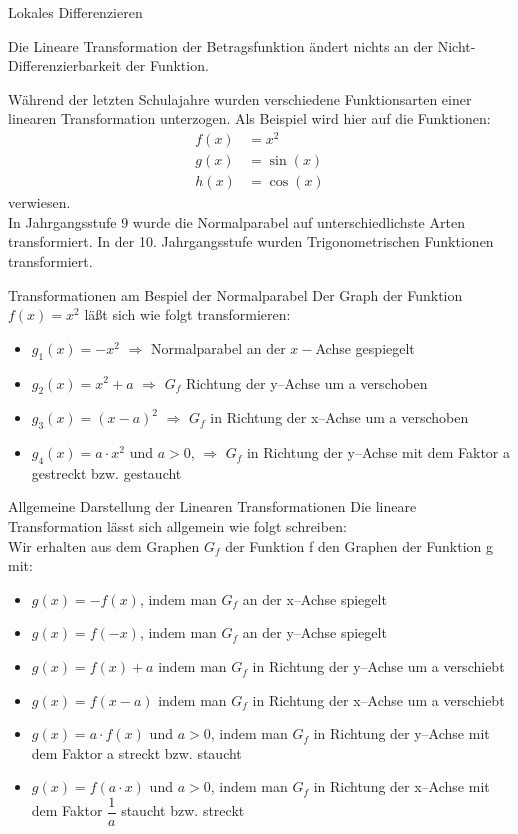 \documentclass[a4paper]{report}
\begin{document}
\begin{section}{Lokales Differenzieren}
\begin{bem*}{}
Die Lineare Transformation der Betragsfunktion ändert nichts an der Nicht-Differenzierbarkeit der Funktion.
\end{bem*}
Während der letzten Schulajahre wurden verschiedene Funktionsarten einer linearen Transformation unterzogen. Als Beispiel wird hier auf die Funktionen: 
 \begin{equation*}
    \begin{split}
        f(x) &= x^2\\
        g(x) &= \sin{(x)}\\
        h(x) &= \cos{(x)}
    \end{split}
\end{equation*}
verwiesen.\\ 
In Jahrgangsstufe 9 wurde die Normalparabel auf unterschiedlichste Arten transformiert. In der 10. Jahrgangsstufe wurden Trigonometrischen Funktionen transformiert.
\begin{bsp*}{Transformationen am Bespiel der Normalparabel}
Der Graph der Funktion $f(x) = x^2$ läßt sich wie folgt transformieren:
\begin{itemize}
\item $g_1(x) = -x^2$ $\Longrightarrow$ Normalparabel an der $x-$Achse gespiegelt
\item $g_2(x) =   x^2 +a$ $\Longrightarrow$ $G_f$  Richtung der y--Achse um a verschoben
\item $g_3(x) =(x-a)^2$ $\Longrightarrow$ $G_f$ in Richtung der x--Achse um a verschoben
\item $g_4(x) =a\cdot x^2$ und $a>0$, $\Longrightarrow$ $G_f$ in Richtung der y--Achse mit dem Faktor a gestreckt bzw. gestaucht
\end{itemize}
\end{bsp*}
\begin{merke}{Allgemeine Darstellung der Linearen Transformationen} 
Die lineare Transformation lässt sich allgemein wie folgt schreiben:\\
Wir erhalten aus dem Graphen $G_f$ der Funktion f den Graphen der Funktion g mit:
\begin{itemize}
\item $g(x) = - f(x)$, indem man $G_f$ an der x--Achse spiegelt
\item $g(x) =f(-x)$, indem man $G_f$ an der y--Achse spiegelt
\item $g(x) = f(x) +a$ indem man $G_f$ in Richtung der y--Achse um a verschiebt
\item $g(x) =f(x-a)$ indem man $G_f$ in Richtung der x--Achse um a verschiebt
\item $g(x) =a\cdot f(x)$ und $a>0$, indem man $G_f$ in Richtung der y--Achse mit dem Faktor a streckt bzw. staucht
\item $g(x) =f(a\cdot x)$ und  $a>0$, indem man $G_f$ in Richtung der x--Achse mit dem Faktor $\dfrac{1}{a}$ staucht bzw. streckt 
\end{itemize}
\end{merke}
\end{section}
\end{document}

